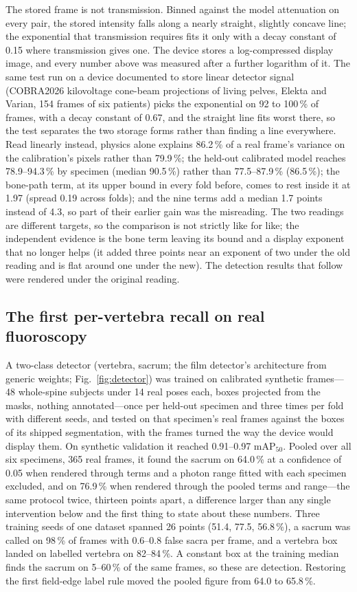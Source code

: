 \documentclass[11pt,letterpaper]{article}
\begin{document}
The stored frame is not transmission. Binned against the model attenuation on every pair, the stored
intensity falls along a nearly straight, slightly concave line; the exponential that transmission requires
fits it only with a decay constant of 0.15 where transmission gives one. The device stores a log-compressed
display image, and every number above was measured after a further logarithm of it. The same test run on
a device documented to store linear detector signal (COBRA2026 kilovoltage cone-beam projections of living
pelves, Elekta and Varian, 154 frames of six patients) picks the exponential on 92 to 100\,\% of frames, with a
decay constant of 0.67, and the straight line fits worst there, so the test separates the two storage forms rather
than finding a line everywhere. Read linearly instead,
physics alone explains 86.2\,\% of a real frame's variance on the calibration's pixels rather than
79.9\,\%; the held-out calibrated model reaches 78.9--94.3\,\% by specimen (median 90.5\,\%) rather than
77.5--87.9\,\% (86.5\,\%); the bone-path term, at its upper bound in every fold before, comes to rest inside
it at 1.97 (spread 0.19 across folds); and the nine terms add a median 1.7 points instead of 4.3, so part of
their earlier gain was the misreading. The two readings are different targets, so the comparison is not
strictly like for like; the independent evidence is the bone term leaving its bound and a display exponent
that no longer helps (it added three points near an exponent of two under the old reading and is flat around
one under the new). The detection results that follow were rendered under the original reading.

\subsection*{The first per-vertebra recall on real fluoroscopy}

A two-class detector (vertebra, sacrum; the film detector's architecture from generic weights; Fig.~\ref{fig:detector}) was
trained on calibrated synthetic frames---48 whole-spine subjects under 14 real poses each, boxes
projected from the masks, nothing annotated---once per held-out specimen and three times per fold with
different seeds, and tested on that specimen's real frames against the boxes of its shipped segmentation,
with the frames turned the way the device would display them. On synthetic validation it reached
0.91--0.97 mAP$_{50}$. Pooled over all six specimens, 365 real frames, it found the sacrum on 64.0\,\% at a
confidence of 0.05 when rendered through terms and a photon range fitted with each specimen excluded, and on
76.9\,\% when rendered through the pooled terms and range---the same protocol twice, thirteen points apart,
a difference larger than any single intervention below and the first thing to state about these numbers.
Three training seeds of one dataset spanned 26 points (51.4, 77.5, 56.8\,\%), a sacrum was called on
98\,\% of frames with 0.6--0.8 false sacra per frame, and a vertebra box landed on labelled vertebra on
82--84\,\%. A constant box at the training median finds the sacrum on 5--60\,\% of the same frames, so these
are detection. Restoring the first field-edge label rule moved the pooled figure from 64.0 to 65.8\,\%.
\end{document}
